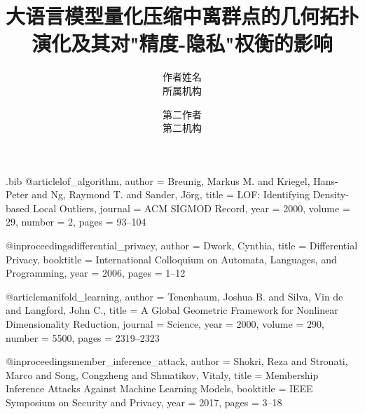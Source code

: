 \begin{filecontents}{\jobname.bib}
@article{lof_algorithm,
  author =       {Breunig, Markus M. and Kriegel, Hans-Peter and Ng, Raymond T. and Sander, Jörg},
  title =        {LOF: Identifying Density-based Local Outliers},
  journal =      {ACM SIGMOD Record},
  year =         2000,
  volume =       29,
  number =       2,
  pages =        {93--104}
}

@inproceedings{differential_privacy,
  author =       {Dwork, Cynthia},
  title =        {Differential Privacy},
  booktitle =    {International Colloquium on Automata, Languages, and Programming},
  year =         2006,
  pages =        {1--12}
}

@article{manifold_learning,
  author =       {Tenenbaum, Joshua B. and Silva, Vin de and Langford, John C.},
  title =        {A Global Geometric Framework for Nonlinear Dimensionality Reduction},
  journal =      {Science},
  year =         2000,
  volume =       290,
  number =       5500,
  pages =        {2319--2323}
}

@inproceedings{member_inference_attack,
  author =       {Shokri, Reza and Stronati, Marco and Song, Congzheng and Shmatikov, Vitaly},
  title =        {Membership Inference Attacks Against Machine Learning Models},
  booktitle =    {IEEE Symposium on Security and Privacy},
  year =         2017,
  pages =        {3--18}
}
\end{filecontents}



\date{}

\title{\Large \bf 大语言模型量化压缩中离群点的几何拓扑演化及其对"精度-隐私"权衡的影响}

\author{
{\rm 作者姓名}\\
所属机构
\and
{\rm 第二作者}\\
第二机构
} %

\maketitle

